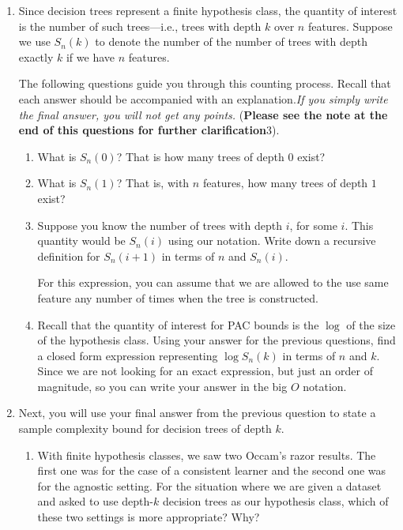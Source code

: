 \begin{enumerate}
\item Since decision trees represent a finite hypothesis class, the quantity of
  interest is the number of such trees---i.e., trees with depth $k$ over $n$
  features. Suppose we use $S_n(k)$ to denote the number of the number of trees
  with depth exactly $k$ if we have $n$ features.

  The following questions guide you through this counting process. Recall that
  each answer should be accompanied with an explanation.\emph{If you simply
    write the final answer, you will not get any points.} (\textbf{Please see the note at the end of this questions for further clarification}3).

  \begin{enumerate}
  \item \relax[2 points] What is $S_n(0)$? That is how many trees of depth $0$
    exist?
    
  \item \relax[3 points] What is $S_n(1)$? That is, with $n$ features, how many
    trees of depth $1$ exist?
    
  \item \relax[4 points] Suppose you know the number of trees with depth $i$,
    for some $i$. This quantity would be $S_n(i)$ using our notation. Write down
    a recursive definition for $S_n(i+1)$ in terms of $n$ and $S_n(i)$.

    For this expression, you can assume that we are allowed to the use same
    feature any number of times when the tree is constructed.

  \item \relax[6 points] Recall that the quantity of interest for PAC bounds is
    the $\log$ of the size of the hypothesis class. Using your answer for the
    previous questions, find a closed form expression representing $\log S_n(k)$
    in terms of $n$ and $k$. Since we are not looking for an exact expression,
    but just an order of magnitude, so you can write your answer in the big $O$
    notation.
    
  \end{enumerate}

\item Next, you will use your final answer from the previous question to state a
  sample complexity bound for decision trees of depth $k$.

  \begin{enumerate}
  \item \relax[3 points] With finite hypothesis classes, we saw two Occam's
    razor results. The first one was for the case of a consistent learner and
    the second one was for the agnostic setting. For the situation where we are
    given a dataset and asked to use depth-$k$ decision trees as our hypothesis
    class, which of these two settings is more appropriate? Why?


\end{enumerate}
\end{enumerate}
